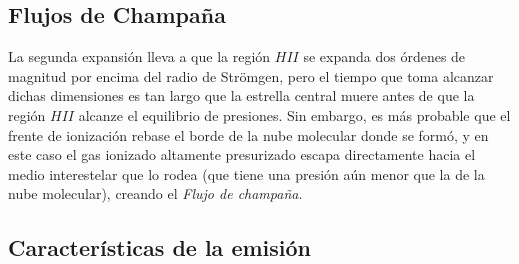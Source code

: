 \subsection{Flujos de Champaña}
La segunda expansión lleva a que la región $HII$ se expanda dos órdenes de magnitud por encima del radio de Strömgen, pero el tiempo que toma alcanzar dichas dimensiones es tan largo que la estrella central muere antes de que la región $HII$ alcanze el equilibrio de presiones. Sin embargo, es más probable que el frente de ionización rebase el borde de la nube molecular donde se formó, y en este caso el gas ionizado altamente presurizado escapa directamente hacia el medio interestelar que lo rodea (que tiene una presión aún menor que la de la nube molecular), creando el \textit{Flujo de champaña}.

\subsection{Características de la emisión}

